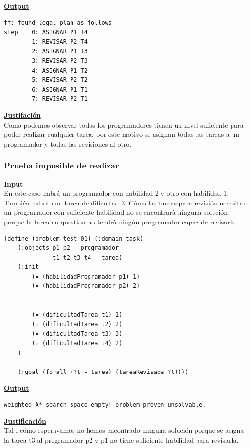 \documentclass[11pt]{article}
\begin{document}
 \noindent \underline{\textbf{Output}}
\medskip
\begin{verbatim}
ff: found legal plan as follows
step    0: ASIGNAR P1 T4
        1: REVISAR P2 T4
        2: ASIGNAR P1 T3
        3: REVISAR P2 T3
        4: ASIGNAR P1 T2
        5: REVISAR P2 T2
        6: ASIGNAR P1 T1
        7: REVISAR P2 T1
\end{verbatim}
\medskip

\noindent \underline{\textbf{Justifación}}\\

Como podemos observar todos los programadores tienen un nivel suficiente para poder realizar cualquier tarea, por este motivo se asignan todas las tareas a un programador y todas las revisiones al otro.

\subsubsection{Prueba imposible de realizar}
\noindent \underline{\textbf{Input}} \\

En este caso habrá un programador con habilidad 2 y otro con habilidad 1. También habrà una tarea de dificultad 3. Cómo las tareas para revisión necesitan un programador con suficiente habilidad no se encontrarà ninguna solución porque la tarea en question no tendrà ningún programador capaz de revisarla.
\medskip
\begin{verbatim}
(define (problem test-01) (:domain task)
    (:objects p1 p2 - programador
			  t1 t2 t3 t4 - tarea)
    (:init
        (= (habilidadProgramador p1) 1)
        (= (habilidadProgramador p2) 2)
        
        
        (= (dificultadTarea t1) 1)
        (= (dificultadTarea t2) 2)
        (= (dificultadTarea t3) 3)
        (= (dificultadTarea t4) 2)
    )

    (:goal (forall (?t - tarea) (tareaRevisada ?t))))
\end{verbatim}

\noindent \underline{\textbf{Output}}
\medskip
\begin{verbatim}
weighted A* search space empty! problem proven unsolvable.
\end{verbatim}
\noindent \underline{\textbf{Justificación}} \\

Tal i cómo esperavamos no hemos encontrado ninguna solución porque se asigna la tarea t3 al programador p2 y p1 no tiene suficiente habilidad para revisarla.
\medskip
\end{document}
